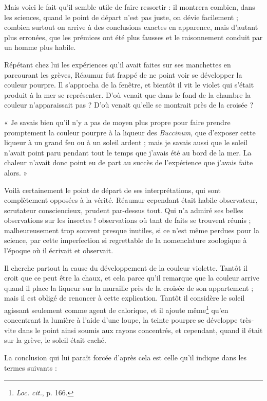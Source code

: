 \documentclass[a4paper, 11pt, oneside, polutonikogreek, french]{article}
\begin{document}
Mais voici le fait qu'il semble utile de faire ressortir : il montrera combien, dans les sciences, quand le point de départ n'est pas juste, on dévie facilement ; combien surtout on arrive à des conclusions exactes en apparence, mais d'autant plus erronées, que les prémices ont été plus fausses et le raisonnement conduit par un homme plus habile.

Répétant chez lui les expériences qu'il avait faites sur ses manchettes en parcourant les grèves, Réaumur fut frappé de ne point voir se développer la couleur pourpre. Il s'approcha de la fenêtre, et bientôt il vit le violet qui s'était produit à la mer se représenter. D'où venait que dans le fond de la chambre la couleur n'apparaissait pas ? D'où venait qu'elle se montrait près de la croisée ?

« Je savais bien qu'il n'y a pas de moyen plus propre pour faire prendre promptement la couleur pourpre à la liqueur des \emph{Buccinum}, que d'exposer cette liqueur à un grand feu ou à un soleil ardent ; mais je savais aussi que le soleil n'avait point paru pendant tout le temps que j'avais été au bord de la mer. La chaleur n'avait donc point eu de part au succès de l'expérience que j'avais faite alors. »

Voilà certainement le point de départ de ses interprétations, qui sont complètement opposées à la vérité. Réaumur cependant était habile observateur, scrutateur consciencieux, prudent par-dessus tout. Qui n'a admiré ses belles observations sur les insectes ! observations où tant de faits se trouvent réunis ; malheureusement trop souvent presque inutiles, si ce n'est même perdues pour la science, par cette imperfection si regrettable de la nomenclature zoologique à l'époque où il écrivait et observait.

Il cherche partout la cause du développement de la couleur violette. Tantôt il croit que ce peut être la chaux, et cela parce qu'il remarque que la couleur arrive quand il place la liqueur sur la muraille près de la croisée de son appartement ; mais il est obligé de renoncer à cette explication. Tantôt il considère le soleil agissant seulement comme agent de calorique, et il ajoute même\footnote{\emph{Loc. cit.}, p. 166.} qu'en concentrant la lumière à l'aide d'une loupe, la teinte pourpre se développe très-vite dans le point ainsi soumis aux rayons concentrés, et cependant, quand il était sur la grève, le soleil était caché.

La conclusion qui lui paraît forcée d'après cela est celle qu'il indique dans les termes suivants :
\end{document}
